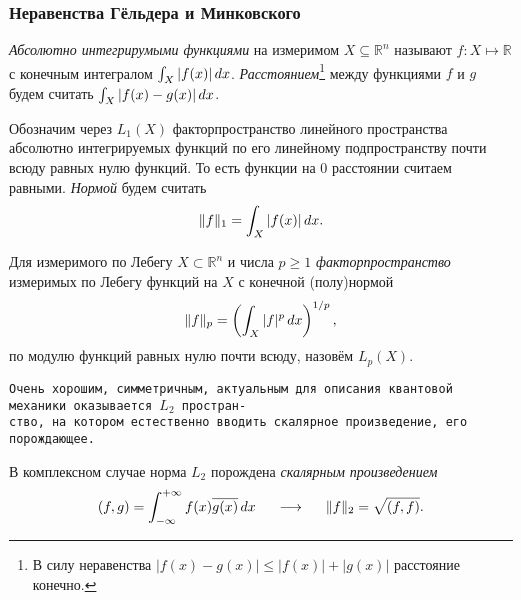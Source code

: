 \subsubsection*{Неравенства Гёльдера и Минковского}


\begin{to_def}
    \textit{Абсолютно интегрирумыми функциями} на измеримом $X \subseteq \mathbb{R}^n$ называют $f \colon X \mapsto \mathbb{R}$ с конечным интегралом $\int_X |f(x)| \, d x$. \textit{Расстоянием}\footnote{
        В силу неравенства $|f(x) - g(x)| \leq |f(x)| + |g(x)|$ расстояние конечно.
    } между функциями $f$ и $g$ будем считать $\int_X |f(x)-g(x)| \, d x$.
\end{to_def}

\begin{to_def}
    Обозначим через $L_1 (X)$ факторпространство  линейного пространства абсолютно интегрируемых функций по его линейному подпространству почти всюду равных нулю функций. То есть функции на $0$ расстоянии считаем равными. \textit{Нормой} будем считать
    \begin{equation*}
        \|f\|_1 = \int_X |f(x)| \, d x.
    \end{equation*}
\end{to_def}

\begin{to_def}
    Для измеримого по Лебегу $X \subset \mathbb{R}^n$ и числа $p \geq 1$ \textit{факторпространство} измеримых по Лебегу функций на $X$ с конечной (полу)нормой
    \begin{equation*}
        \|f\|_p
        = 
        \left(
            \int_X |f|^p \, d x
        \right)^{1/p},
    \end{equation*}
    по модулю функций равных нулю почти всюду,
    назовём $L_p (X)$.
\end{to_def}

\texttt{Очень хорошим, симметричным, актуальным для описания квантовой механики оказывается $L_2$ простран-\\ство, на котором естественно вводить скалярное произведение, его порождающее.} 

 \begin{to_def}
     В комплексном случае норма $L_2$ порождена \textit{скалярным произведением}
     \begin{equation*}
         (f, g) = \int_{-\infty}^{+\infty} f(x) \overline{g(x)} \, d x
         \hspace{0.5cm} \longrightarrow \hspace{0.5cm}
         \|f\|_2 = \sqrt{(f, f)}.
     \end{equation*}
 \end{to_def}


